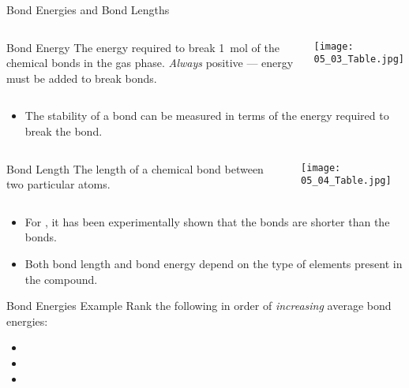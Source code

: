 \documentclass[notes=hide]{beamer}
\begin{document}
\begin{frame}[allowframebreaks=1]{Bond Energies and Bond Lengths}
	\begin{columns}
		\begin{block}{Bond Energy}
			The energy required to break \SI{1}{\mole} of the chemical bonds
			in the gas phase. \emph{Always} positive --- energy must be
			added to break bonds.
		\end{block}
		\begin{center}
			\texttt{[image: 05\_03\_Table.jpg]}
		\end{center}
	\end{columns}

	\begin{itemize}
		\item The stability of a bond can be measured in terms of the
			energy required to break the bond.
	\end{itemize}

	\framebreak

	\begin{columns}
	\column{0.35\textwidth}
	\begin{block}{Bond Length}
		The length of a chemical bond between two particular atoms.
	\end{block}
	\begin{center}
		\texttt{[image: 05\_04\_Table.jpg]}
	\end{center}
\end{columns}
	\begin{itemize}
		\item For , it has been experimentally shown that the
			 bonds are shorter than the
			bonds.
		\item Both bond length and bond energy depend on the type of
			elements present in the compound.
	\end{itemize}
\end{frame}

\begin{frame}[t]{Bond Energies Example}
	Rank the following in order of \emph{increasing} average bond energies:

	\begin{itemize}
		\item {} \mode<presentation>{\qquad
			\alt<+(1)->{\emph{\SI{347}{\kilo\joule\per\mole}}}{}}
		\item {} \mode<presentation>{\qquad
			\alt<+(1)->{\emph{\SI{611}{\kilo\joule\per\mole}}}{}}
		\item {} \mode<presentation>{\qquad
			\alt<+(1)->{\emph{\SI{837}{\kilo\joule\per\mole}}}{}}
	\end{itemize}
\end{frame}
\end{document}
